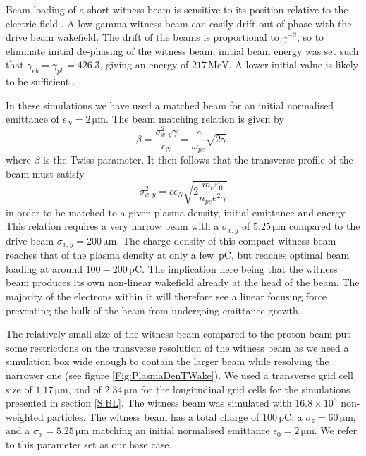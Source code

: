 \documentclass[aps,prstab,reprint,amsmath,amssymb,groupedaddress]{revtex4-1}
\newcommand{\unit}[1]{\,\mathrm{#1}}
\newcommand{\nexp}[1]{\times 10^{#1}}
\begin{document}
Beam loading of a short witness beam is sensitive to its position relative to the electric field \cite{tzoufras:2009}.
A low gamma witness beam can easily drift out of phase with the drive beam wakefield. The drift of the beams is
proportional to $\gamma^{-2}$, so to eliminate initial de-phasing of the witness beam, initial beam energy was set such
that $\gamma_{eb} = \gamma_{pb} = 426.3$, giving an energy of $217\unit{MeV}$. A lower initial value is likely to be
sufficient \cite{berglyd_olsen:2015}.

In these simulations we have used a matched beam for an initial normalised emittance of $\epsilon_{N} = 2\unit{\mu m}$.
The beam matching relation is given by
\begin{equation}
    \beta = \frac{\sigma_{x,y}^{2}\gamma}{\epsilon_{N}}
          = \frac{c}{\omega_{pe}}\sqrt{2\gamma}, \label{EQ:MatchedB}
\end{equation}
where $\beta$ is the Twiss parameter. It then follows that the transverse profile of the beam must satisfy
\begin{equation}
    \sigma_{x,y}^{2} = c\epsilon_{N}\sqrt{2\frac{m_{e}\varepsilon_{0}}{n_{pe}e^{2}\gamma}} \label{EQ:MatchedR}
\end{equation}
in order to be matched to a given plasma density, initial emittance and energy. This relation requires a very narrow
beam with a $\sigma_{x,y}$ of $5.25\unit{\mu m}$ compared to the drive beam $\sigma_{x,y} = 200\unit{\mu m}$. The charge
density of this compact witness beam reaches that of the plasma density at only a few $\unit{pC}$, but reaches optimal
beam loading at around $100-200\unit{pC}$. The implication here being that the witness beam produces its own non-linear
wakefield already at the head of the beam. The majority of the electrons within it will therefore see a linear focusing
force preventing the bulk of the beam from undergoing emittance growth.

The relatively small size of the witness beam compared to the proton beam put some restrictions on the transverse
resolution of the witness beam as we need a simulation box wide enough to contain the larger beam while resolving the
narrower one (see figure \ref{Fig:PlasmaDenTWake}). We used a transverse grid cell size of $1.17\unit{\mu m}$, and of
$2.34\unit{\mu m}$ for the longitudinal grid cells for the simulations presented in section \ref{S:BL}. The witness beam
was simulated with $16.8\nexp{6}$ non-weighted particles. The witness beam has a total charge of $100\unit{pC}$, a
$\sigma_{z}=60\unit{\mu m}$, and a $\sigma_{x}=5.25\unit{\mu m}$ matching an initial normalised emittance
$\epsilon_{0} = 2\unit{\mu m}$. We refer to this parameter set as our base case.
\end{document}
